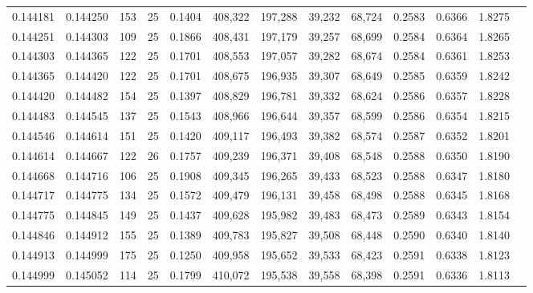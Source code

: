 \begin{tabular}{rrrrrrrrrrrrr}
0.144181 & 0.144250 &   153 &  25 &                                     0.1404 & 408,322 & 197,288 &  39,232 &  68,724 & 0.2583 & 0.6366 & 1.8275 \\
0.144251 & 0.144303 &   109 &  25 &                                     0.1866 & 408,431 & 197,179 &  39,257 &  68,699 & 0.2584 & 0.6364 & 1.8265 \\
0.144303 & 0.144365 &   122 &  25 &                                     0.1701 & 408,553 & 197,057 &  39,282 &  68,674 & 0.2584 & 0.6361 & 1.8253 \\
0.144365 & 0.144420 &   122 &  25 &                                     0.1701 & 408,675 & 196,935 &  39,307 &  68,649 & 0.2585 & 0.6359 & 1.8242 \\
0.144420 & 0.144482 &   154 &  25 &                                     0.1397 & 408,829 & 196,781 &  39,332 &  68,624 & 0.2586 & 0.6357 & 1.8228 \\
0.144483 & 0.144545 &   137 &  25 &                                     0.1543 & 408,966 & 196,644 &  39,357 &  68,599 & 0.2586 & 0.6354 & 1.8215 \\
0.144546 & 0.144614 &   151 &  25 &                                     0.1420 & 409,117 & 196,493 &  39,382 &  68,574 & 0.2587 & 0.6352 & 1.8201 \\
0.144614 & 0.144667 &   122 &  26 &                                     0.1757 & 409,239 & 196,371 &  39,408 &  68,548 & 0.2588 & 0.6350 & 1.8190 \\
0.144668 & 0.144716 &   106 &  25 &                                     0.1908 & 409,345 & 196,265 &  39,433 &  68,523 & 0.2588 & 0.6347 & 1.8180 \\
0.144717 & 0.144775 &   134 &  25 &                                     0.1572 & 409,479 & 196,131 &  39,458 &  68,498 & 0.2588 & 0.6345 & 1.8168 \\
0.144775 & 0.144845 &   149 &  25 &                                     0.1437 & 409,628 & 195,982 &  39,483 &  68,473 & 0.2589 & 0.6343 & 1.8154 \\
0.144846 & 0.144912 &   155 &  25 &                                     0.1389 & 409,783 & 195,827 &  39,508 &  68,448 & 0.2590 & 0.6340 & 1.8140 \\
0.144913 & 0.144999 &   175 &  25 &                                     0.1250 & 409,958 & 195,652 &  39,533 &  68,423 & 0.2591 & 0.6338 & 1.8123 \\
0.144999 & 0.145052 &   114 &  25 &                                     0.1799 & 410,072 & 195,538 &  39,558 &  68,398 & 0.2591 & 0.6336 & 1.8113 \\

\end{tabular}
